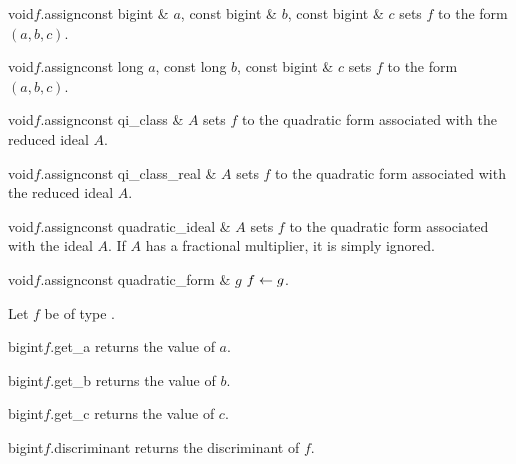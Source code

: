 \begin{fcode}{void}{$f$.assign}{const bigint & $a$, const bigint & $b$, const bigint & $c$}
  sets $f$ to the form $(a,b,c)$.
\end{fcode}

\begin{fcode}{void}{$f$.assign}{const long $a$, const long $b$, const bigint & $c$}
  sets $f$ to the form $(a,b,c)$.
\end{fcode}

\begin{fcode}{void}{$f$.assign}{const qi_class & $A$}
  sets $f$ to the quadratic form associated with the reduced ideal $A$.
\end{fcode}

\begin{fcode}{void}{$f$.assign}{const qi_class_real & $A$}
  sets $f$ to the quadratic form associated with the reduced ideal $A$.
\end{fcode}

\begin{fcode}{void}{$f$.assign}{const quadratic_ideal & $A$}
  sets $f$ to the quadratic form associated with the ideal $A$.  If $A$ has a fractional
  multiplier, it is simply ignored.
\end{fcode}

\begin{fcode}{void}{$f$.assign}{const quadratic_form & $g$}
  $f \leftarrow g$.
\end{fcode}



\ACCS

Let $f$ be of type .

\begin{cfcode}{bigint}{$f$.get_a}{}
  returns the value of $a$.
\end{cfcode}

\begin{cfcode}{bigint}{$f$.get_b}{}
  returns the value of $b$.
\end{cfcode}

\begin{cfcode}{bigint}{$f$.get_c}{}
  returns the value of $c$.
\end{cfcode}

\begin{cfcode}{bigint}{$f$.discriminant}{}
  returns the discriminant of $f$.
\end{cfcode}

